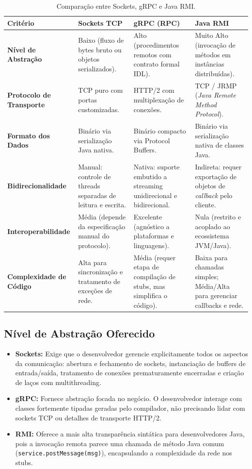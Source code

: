 \documentclass[12pt,a4paper]{article}
\begin{document}
\begin{table}[htbp]
\centering
\small
\caption{Comparação entre Sockets, gRPC e Java RMI.}
\label{tab:comparacao}
\begin{tabularx}{\textwidth}{lXXX}
\toprule
\textbf{Critério} & \textbf{Sockets TCP} & \textbf{gRPC (RPC)} & \textbf{Java RMI} \\
\midrule
\textbf{Nível de Abstração} & Baixo (fluxo de bytes bruto ou objetos serializados). & Alto (procedimentos remotos com contrato formal IDL). & Muito Alto (invocação de métodos em instâncias distribuídas). \\
\midrule
\textbf{Protocolo de Transporte} & TCP puro com portas customizadas. & HTTP/2 com multiplexação de conexões. & TCP / JRMP (\textit{Java Remote Method Protocol}). \\
\midrule
\textbf{Formato dos Dados} & Binário via serialização Java nativa. & Binário compacto via Protocol Buffers. & Binário via serialização nativa de classes Java. \\
\midrule
\textbf{Bidirecionalidade} & Manual: controle de threads separadas de leitura e escrita. & Nativa: suporte embutido a streaming unidirecional e bidirecional. & Indireta: requer exportação de objetos de \textit{callback} pelo cliente. \\
\midrule
\textbf{Interoperabilidade} & Média (depende da especificação manual do protocolo). & Excelente (agnóstico a plataformas e linguagens). & Nula (restrito e acoplado ao ecossistema JVM/Java). \\
\midrule
\textbf{Complexidade de Código} & Alta para sincronização e tratamento de exceções de rede. & Média (requer etapa de compilação de stubs, mas simplifica o código). & Baixa para chamadas simples; Média/Alta para gerenciar callbacks e rede. \\
\bottomrule
\end{tabularx}
\end{table}

\subsection{Nível de Abstração Oferecido}
\begin{itemize}
    \item \textbf{Sockets:} Exige que o desenvolvedor gerencie explicitamente todos os aspectos da comunicação: abertura e fechamento de sockets, instanciação de buffers de entrada/saída, tratamento de conexões prematuramente encerradas e criação de laços com multithreading.
    \item \textbf{gRPC:} Fornece abstração focada no negócio. O desenvolvedor interage com classes fortemente tipadas geradas pelo compilador, não precisando lidar com sockets TCP ou detalhes de transporte HTTP/2.
    \item \textbf{RMI:} Oferece a mais alta transparência sintática para desenvolvedores Java, pois a invocação remota parece uma chamada de método Java comum (\texttt{service.postMessage(msg)}), encapsulando a complexidade da rede nos stubs.
\end{itemize}
\end{document}
